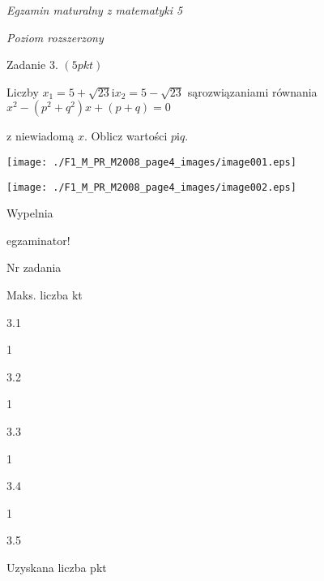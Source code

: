 \documentclass[a4paper,12pt]{article}
\begin{document}
{\it Egzamin maturalny z matematyki 5}

{\it Poziom rozszerzony}

Zadanie 3. $(5pkt)$

Liczby $x_{1}=5+\sqrt{23}\mathrm{i}x_{2}=5-\sqrt{23}$ sąrozwiązaniami równania $x^{2}-(p^{2}+q^{2})x+(p+q)=0$

z niewiadomą $x$. Oblicz wartości $p \mathrm{i}q.$
\begin{center}
\texttt{[image: ./F1\_M\_PR\_M2008\_page4\_images/image001.eps]}

\texttt{[image: ./F1\_M\_PR\_M2008\_page4\_images/image002.eps]}
\end{center}
Wypelnia

egzaminator!

Nr zadania

Maks. liczba kt

3.1

1

3.2

1

3.3

1

3.4

1

3.5

Uzyskana liczba pkt
\end{document}
